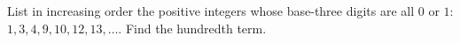 List in increasing order the positive integers whose base-three digits are all $0$ or $1$: $1,3,4,9,10,12,13,\ldots$. Find the hundredth term.
